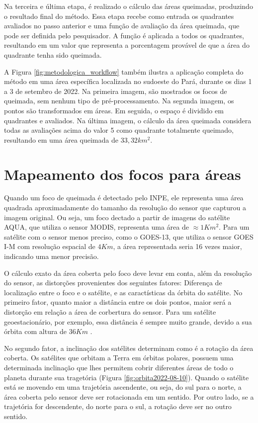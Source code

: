 \documentclass[cic,tc]{iiufrgs}
\begin{document}
Na terceira e última etapa, é realizado o cálculo das áreas queimadas, produzindo o resultado final do método. Essa etapa recebe como entrada os quadrantes avaliados no passo anterior e uma função de avaliação da área queimada, que pode ser definida pelo pesquisador. A função é aplicada a todos os quadrantes, resultando em um valor que representa a porcentagem provável de que a área do quadrante tenha sido queimada.

A Figura \ref{fig:metodologica_workflow} também ilustra a aplicação completa do método em uma área específica localizada no sudoeste do Pará, durante os dias 1 a 3 de setembro de 2022. Na primeira imagem, são mostrados os focos de queimada, sem nenhum tipo de pré-processamento. Na segunda imagem, os pontos são transformados em áreas. Em seguida, o espaço é dividido em quadrantes e avaliados. Na última imagem, o cálculo da área queimada considera todas as avaliações acima do valor 5 como quadrante totalmente queimado, resultando em uma área queimada de $33,32 km^2$.

\section{Mapeamento dos focos para áreas}

Quando um foco de queimada é detectado pelo INPE, ele representa uma área quadrada aproximadamente do tamanho da resolução do sensor que capturou a imagem original. Ou seja, um foco dectado a partir de imagens do satélite AQUA, que utiliza o sensor MODIS, representa uma área de $\approx1Km^2$. Para um satélite com o sensor menos preciso, como o GOES-13, que utiliza o sensor GOES I-M com resolução espacial de $4Km$, a área representada seria 16 vezes maior, indicando uma menor precisão. \par

O cálculo exato da área coberta pelo foco deve levar em conta, além da resolução do sensor, as distorções provenientes dos seguintes fatores: Diferença de localização entre o foco e o satélite, e as caractísticas da órbita do satélite. No primeiro fator, quanto maior a distância entre os dois pontos, maior será a distorção em relação a área de corbertura do sensor. Para um satélite geoestacionário, por exemplo, essa distância é sempre muito grande, devido a sua órbita com altura de $36Km$ \citep{EmbrapaSatelites}. \par

No segundo fator, a inclinação dos satélites determinam como é a rotação da área coberta. Os satélites que orbitam a Terra em órbitas polares, possuem uma determinada inclinação que lhes permitem cobrir diferentes áreas de todo o planeta durante sua tragetória (Figura \ref{fig:orbita2022-08-10}). Quando o satélite está se movendo em uma trajetória ascendente, ou seja, do sul para o norte, a área coberta pelo sensor deve ser rotacionada em um sentido. Por outro lado, se a trajetória for descendente, do norte para o sul, a rotação deve ser no outro sentido. \par
\end{document}

